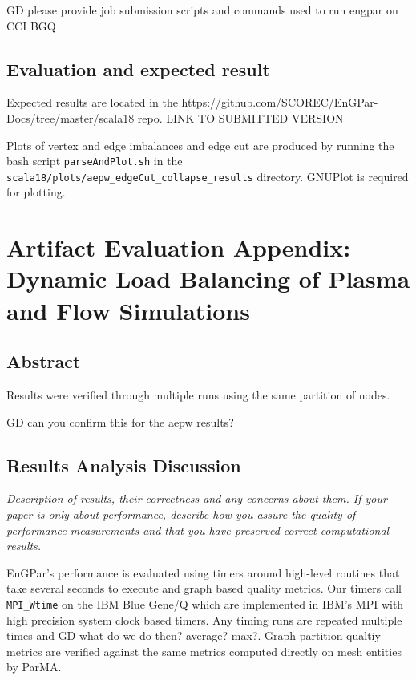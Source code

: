 {\color{red} GD please provide job submission scripts and commands
used to run engpar on CCI BGQ}

\subsection{Evaluation and expected result}

Expected results are located in the 
https://github.com/SCOREC/EnGPar-Docs/tree/master/scala18
repo.
{\color{red} LINK TO SUBMITTED VERSION}

Plots of vertex and edge imbalances and edge cut are produced by
running the bash script \texttt{parseAndPlot.sh} in the
\texttt{scala18/plots/aepw_edgeCut_collapse_results} directory.
GNUPlot is required for plotting.

\section{Artifact Evaluation Appendix: Dynamic Load Balancing of Plasma and Flow Simulations}

\subsection{Abstract}

Results were verified through multiple runs using the same partition of nodes.

{\color{red} GD can you confirm this for the aepw results?}


\subsection{Results Analysis Discussion}

{\em Description of results, their correctness and any concerns about them. If your paper is only about performance, describe how you assure the quality of performance measurements and that you have preserved correct computational results.}

EnGPar's performance is evaluated using timers around high-level routines that
take several seconds to execute and graph based quality metrics.
Our timers call \texttt{MPI\_Wtime} on the IBM Blue Gene/Q which are implemented
in IBM's MPI with high precision system clock based timers.
Any timing runs are repeated multiple times and {\color{red} GD what do we do then? average?
max?}.
Graph partition qualtiy metrics are verified against the same metrics computed
directly on mesh entities by ParMA.

